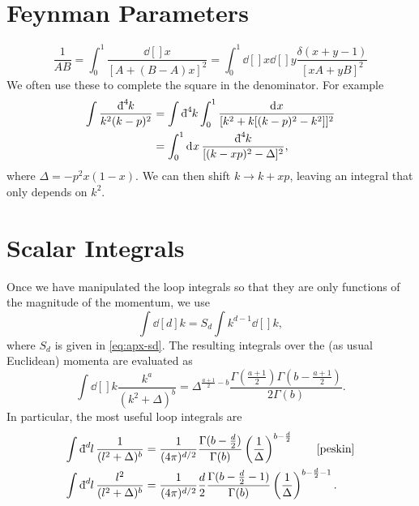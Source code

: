 \begin{appendices}
\section{Feynman Parameters}%
\label{sec:feynman_parameters}

\begin{equation}
  \frac{1}{A B} = \int_0^1 \frac{\dd[]{x}}{[A + (B - A) x]^2} = \int_0^1 \dd[]{x} \dd[]{y} \frac{\delta(x + y - 1)}{[x A + y B]^2}
\end{equation}
We often use these to complete the square in the denominator. For example
\begin{align}
  \int \frac{\bdd[4]{k}}{k^2 (k - p)^2} &= \int \bdd[4]{k} \int_0^1 \frac{\dd[]{x}}{[k^2 + k [(k - p)^2 - k^2]]^2} \\
					&= \int_0^1 \dd[]{x} \frac{\bdd[4]{k}}{[(k - xp)^2 - \Delta]^2},
\end{align}
where $\Delta = - p^2 x (1 - x)$. We can then shift $k \to k + xp$, leaving an integral that only depends on $k^2$.

\section{Scalar Integrals}%
\label{sec:scalar_integrals}

Once we have manipulated the loop integrals so that they are only functions of the magnitude of the momentum, we use
\begin{equation}
  \int \dd[d]{k} = S_d \int k^{d - 1} \dd[]{k},
\end{equation}
where $S_d$ is given in \eqref{eq:apx-sd}.
The resulting integrals over the (as usual Euclidean) momenta are evaluated as
\begin{equation}
  \int \dd[]{k} \frac{k^a}{(k^2 + \Delta)^b} = \Delta^{\frac{a + 1}{2} - b} \frac{\Gamma \left( \frac{a + 1}{2} \right) \Gamma \left( b - \frac{a + 1}{2} \right)}{2 \Gamma(b)}.
\end{equation}
In particular, the most useful loop integrals are 
\begin{subequations}
  \label{eq:loop-identities}
  \begin{align}
    \int \bdd[d]{l} \frac{1}{(l^2 + \Delta)^b} &= \frac{1}{(4 \pi)^{d / 2}} \frac{\Gamma(b - \frac{d}{2})}{\Gamma(b)} \left( \frac{1}{\Delta} \right)^{b - \frac{d}{2}} \qquad \cite[\text{Eq.~(7.85)}]{peskin} \\
    \int \bdd[d]{l} \frac{l^2}{(l^2 + \Delta)^b} &= \frac{1}{(4 \pi)^{d / 2}} \frac{d}{2} \frac{\Gamma(b - \frac{d}{2} - 1)}{\Gamma(b)} \left( \frac{1}{\Delta} \right)^{b - \frac{d}{2} - 1}.
  \end{align}
\end{subequations}

\end{appendices}
